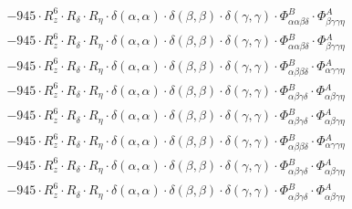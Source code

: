 \documentclass{article}
\begin{document}
\begin{subequations}
\begin{gather}
\begin{array}{c}
 \\[0.2em] 		 - 945 \cdot R_{z}^{6} \cdot R_{\delta{}} \cdot R_{\eta{}} \cdot \delta{}\left(\alpha{}, \alpha{}\right) \cdot \delta{}\left(\beta{}, \beta{}\right) \cdot \delta{}\left(\gamma{}, \gamma{}\right) \cdot \Phi{}^{B}_{\alpha{}\alpha{}\beta{}\delta{}} \cdot \Phi{}^{A}_{\beta{}\gamma{}\gamma{}\eta{}} 
 \\[0.2em] 		 - 945 \cdot R_{z}^{6} \cdot R_{\delta{}} \cdot R_{\eta{}} \cdot \delta{}\left(\alpha{}, \alpha{}\right) \cdot \delta{}\left(\beta{}, \beta{}\right) \cdot \delta{}\left(\gamma{}, \gamma{}\right) \cdot \Phi{}^{B}_{\alpha{}\alpha{}\beta{}\delta{}} \cdot \Phi{}^{A}_{\beta{}\gamma{}\gamma{}\eta{}} 
 \\[0.2em] 		 - 945 \cdot R_{z}^{6} \cdot R_{\delta{}} \cdot R_{\eta{}} \cdot \delta{}\left(\alpha{}, \alpha{}\right) \cdot \delta{}\left(\beta{}, \beta{}\right) \cdot \delta{}\left(\gamma{}, \gamma{}\right) \cdot \Phi{}^{B}_{\alpha{}\beta{}\beta{}\delta{}} \cdot \Phi{}^{A}_{\alpha{}\gamma{}\gamma{}\eta{}} 
 \\[0.2em] 		 - 945 \cdot R_{z}^{6} \cdot R_{\delta{}} \cdot R_{\eta{}} \cdot \delta{}\left(\alpha{}, \alpha{}\right) \cdot \delta{}\left(\beta{}, \beta{}\right) \cdot \delta{}\left(\gamma{}, \gamma{}\right) \cdot \Phi{}^{B}_{\alpha{}\beta{}\gamma{}\delta{}} \cdot \Phi{}^{A}_{\alpha{}\beta{}\gamma{}\eta{}} 
 \\[0.2em] 		 - 945 \cdot R_{z}^{6} \cdot R_{\delta{}} \cdot R_{\eta{}} \cdot \delta{}\left(\alpha{}, \alpha{}\right) \cdot \delta{}\left(\beta{}, \beta{}\right) \cdot \delta{}\left(\gamma{}, \gamma{}\right) \cdot \Phi{}^{B}_{\alpha{}\beta{}\gamma{}\delta{}} \cdot \Phi{}^{A}_{\alpha{}\beta{}\gamma{}\eta{}} 
 \\[0.2em] 		 - 945 \cdot R_{z}^{6} \cdot R_{\delta{}} \cdot R_{\eta{}} \cdot \delta{}\left(\alpha{}, \alpha{}\right) \cdot \delta{}\left(\beta{}, \beta{}\right) \cdot \delta{}\left(\gamma{}, \gamma{}\right) \cdot \Phi{}^{B}_{\alpha{}\beta{}\beta{}\delta{}} \cdot \Phi{}^{A}_{\alpha{}\gamma{}\gamma{}\eta{}} 
 \\[0.2em] 		 - 945 \cdot R_{z}^{6} \cdot R_{\delta{}} \cdot R_{\eta{}} \cdot \delta{}\left(\alpha{}, \alpha{}\right) \cdot \delta{}\left(\beta{}, \beta{}\right) \cdot \delta{}\left(\gamma{}, \gamma{}\right) \cdot \Phi{}^{B}_{\alpha{}\beta{}\gamma{}\delta{}} \cdot \Phi{}^{A}_{\alpha{}\beta{}\gamma{}\eta{}} 
 \\[0.2em] 		 - 945 \cdot R_{z}^{6} \cdot R_{\delta{}} \cdot R_{\eta{}} \cdot \delta{}\left(\alpha{}, \alpha{}\right) \cdot \delta{}\left(\beta{}, \beta{}\right) \cdot \delta{}\left(\gamma{}, \gamma{}\right) \cdot \Phi{}^{B}_{\alpha{}\beta{}\gamma{}\delta{}} \cdot \Phi{}^{A}_{\alpha{}\beta{}\gamma{}\eta{}} 

\end{array}
\end{gather}
\end{subequations}
\end{document}
